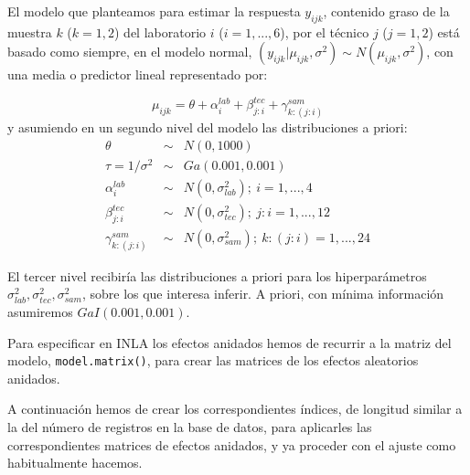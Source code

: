 \documentclass[
]{book}
\begin{document}
El modelo que planteamos para estimar la respuesta \(y_{ijk}\), contenido graso de la muestra \(k\) (\(k=1,2\)) del laboratorio \(i\) (\(i=1,...,6\)), por el técnico \(j\) (\(j=1,2\)) está basado como siempre, en el modelo normal, \((y_{ijk}|\mu_{ijk},\sigma^2) \sim N(\mu_{ijk},\sigma^2)\), con una media o predictor lineal representado por:

\[ \mu_{ijk}= \theta + \alpha_i^{lab} + \beta_{j:i}^{tec} + \gamma_{k:(j:i)}^{sam}\]
y asumiendo en un segundo nivel del modelo las distribuciones a priori:
\begin{eqnarray*}
\theta &\sim& N(0,1000) \\
\tau=1/\sigma^2 &\sim& Ga(0.001,0.001) \\
\alpha_i^{lab}&\sim& N(0,\sigma_{lab}^2); \  i = 1,...,4 \\
\beta_{j:i}^{tec}&\sim& N(0,\sigma_{tec}^2); \  j:i = 1,...,12 \\
\gamma_{k:(j:i)}^{sam}&\sim& N(0,\sigma_{sam}^2); \ k:(j:i)=1,...,24
\end{eqnarray*}

El tercer nivel recibiría las distribuciones a priori para los hiperparámetros \(\sigma_{lab}^2, \sigma_{tec}^2,\sigma_{sam}^2\), sobre los que interesa inferir. A priori, con mínima información asumiremos \(GaI(0.001,0.001)\).

Para especificar en INLA los efectos anidados hemos de recurrir a la matriz del modelo, \texttt{model.matrix()}, para crear las matrices de los efectos aleatorios anidados.

A continuación hemos de crear los correspondientes índices, de longitud similar a la del número de registros en la base de datos, para aplicarles las correspondientes matrices de efectos anidados, y ya proceder con el ajuste como habitualmente hacemos.
\end{document}
